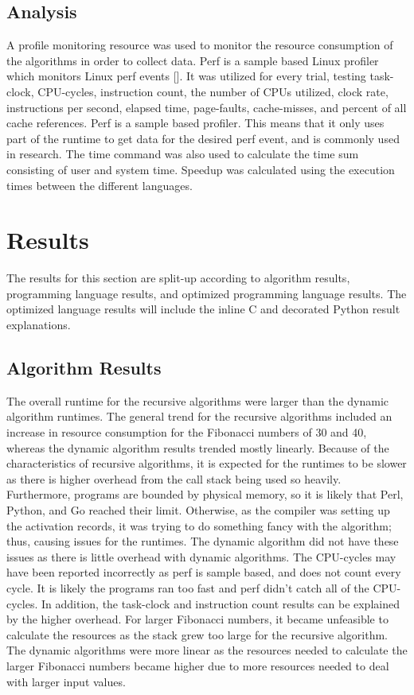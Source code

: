 \documentclass{sig-alternate}
\begin{document}
\subsection{Analysis}

A profile monitoring resource was used to monitor the resource consumption of the algorithms in order to collect data. Perf is a sample based Linux profiler which monitors Linux perf events [\cite{perf}]. It was utilized for every trial, testing task-clock, CPU-cycles, instruction count, the number of CPUs utilized, clock rate, instructions per second, elapsed time, page-faults, cache-misses, and percent of all cache references. Perf is a sample based profiler. This means that it only uses part of the runtime to get data for the desired perf event, and is commonly used in research. The time command was also used to calculate the time sum consisting of user and system time. Speedup was calculated using the execution times between the different languages.

\section{Results}

The results for this section are split-up according to algorithm results, programming language results, and optimized programming language results. The optimized language results will include the inline C and decorated Python result explanations.

\subsection{Algorithm Results}

The overall runtime for the recursive algorithms were larger than the dynamic algorithm runtimes. The general trend for the recursive algorithms included an increase in resource consumption for the Fibonacci numbers of 30 and 40, whereas the dynamic algorithm results trended mostly linearly. Because of the characteristics of recursive algorithms, it is expected for the runtimes to be slower as there is higher overhead from the call stack being used so heavily. Furthermore, programs are bounded by physical memory, so it is likely that Perl, Python, and Go reached their limit. Otherwise, as the compiler was setting up the activation records, it was trying to do something fancy with the algorithm; thus, causing issues for the runtimes. The dynamic algorithm did not have these issues as there is little overhead with dynamic algorithms. The CPU-cycles may have been reported incorrectly as perf is sample based, and does not count every cycle. It is likely the programs ran too fast and perf didn’t catch all of the CPU-cycles. In addition, the task-clock and instruction count results can be explained by the higher overhead. For larger Fibonacci numbers, it became unfeasible to calculate the resources as the stack grew too large for the recursive algorithm. The dynamic algorithms were more linear as the resources needed to calculate the larger Fibonacci numbers became higher due to more resources needed to deal with larger input values.
\end{document}
